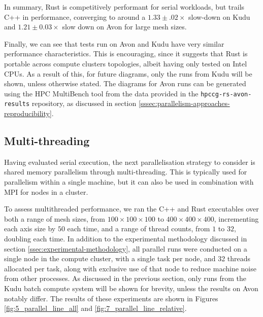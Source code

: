 In summary, Rust is competitively performant for serial workloads, but trails C++ in performance, converging to around a $1.33 \pm .02 \times$ slow-down on Kudu and $1.21 \pm 0.03 \times$ slow down on Avon for large mesh sizes.

Finally, we can see that tests run on Avon and Kudu have very similar performance characteristics. This is encouraging, since it suggests that Rust is portable across compute clusters topologies, albeit having only tested on Intel CPUs. As a result of this, for future diagrams, only the runs from Kudu will be shown, unless otherwise stated. The diagrams for Avon runs can be generated using the HPC MultiBench tool from the data provided in the \texttt{hpccg-rs-avon-results} repository, as discussed in section \ref{sssec:parallelism-approaches-reproducibility}.

\subsection{Multi-threading}
\label{ssec:multi-threaded}

Having evaluated serial execution, the next parallelisation strategy to consider is shared memory parallelism through multi-threading. This is typically used for parallelism within a single machine, but it can also be used in combination with MPI for nodes in a cluster.

To assess multithreaded performance, we ran the C++ and Rust executables over both a range of mesh sizes, from $100 \times 100 \times 100$ to $400 \times 400 \times 400$, incrementing each axis size by $50$ each time, and a range of thread counts, from $1$ to $32$, doubling each time. In addition to the experimental methodology discussed in section \ref{ssec:experimental-methodology}, all parallel runs were conducted on a single node in the compute cluster, with a single task per node, and 32 threads allocated per task, along with exclusive use of that node to reduce machine noise from other processes. As discussed in the previous section, only runs from the Kudu batch compute system will be shown for brevity, unless the results on Avon notably differ. The results of these experiments are shown in Figures \ref{fig:5_parallel_line_all} and \ref{fig:7_parallel_line_relative}.

